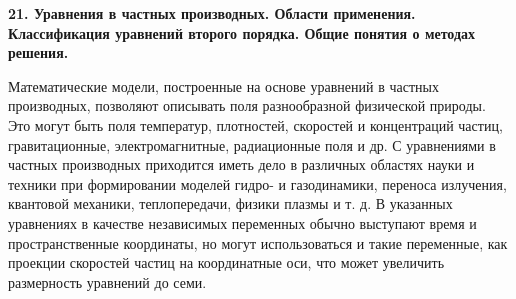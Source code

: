 \documentclass[a4paper,14pt]{article}
\begin{document}
\begin{figure}[!h]
	\label{fig:t205}
\end{figure}
\newpage
\begin{figure}[!h]
	\label{fig:t206}
\end{figure}

\textbf{21. Уравнения в частных производных. Области применения. Классификация уравнений второго порядка. Общие понятия о методах решения.}

Математические модели, построенные на основе уравнений в частных
производных, позволяют описывать поля разнообразной физической природы. Это могут
быть поля температур, плотностей, скоростей и концентраций частиц, гравитационные,
электромагнитные, радиационные поля и др. С уравнениями в частных производных
приходится иметь дело в различных областях науки и техники при формировании
моделей гидро- и газодинамики, переноса излучения, квантовой механики,
теплопередачи, физики плазмы и т. д. В указанных уравнениях в качестве независимых
переменных обычно выступают время и пространственные координаты, но могут
использоваться и такие переменные, как проекции скоростей частиц на координатные оси,
что может увеличить размерность уравнений до семи.
\end{document}
